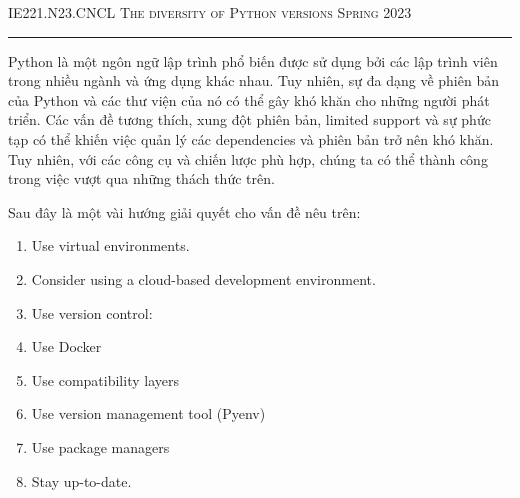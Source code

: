 \documentclass[12pt]{amsart}
\begin{document}
\thispagestyle{empty}

{\scshape IE221.N23.CNCL} \hfill {\scshape \large The diversity of Python versions} \hfill {\scshape Spring 2023}
 
\smallskip

\hrule

\bigskip
Python là một ngôn ngữ lập trình phổ biến được sử dụng bởi các lập trình viên trong nhiều ngành 
và ứng dụng khác nhau. Tuy nhiên, sự đa dạng về phiên bản của Python và các thư viện của nó có 
thể gây khó khăn cho những người phát triển. Các vấn đề tương thích, xung đột phiên bản, 
limited support và sự phức tạp có thể khiến việc quản lý các dependencies và phiên bản trở nên khó khăn. 
Tuy nhiên, với các công cụ và chiến lược phù hợp, chúng ta có thể thành công trong việc 
vượt qua những thách thức trên.
\bigskip

\bigskip

Sau đây là một vài hướng giải quyết cho vấn đề nêu trên:

\begin{enumerate}

\item  Use virtual environments.

\medskip

\item  Consider using a cloud-based development environment.

\medskip

\item  Use version control:

\medskip

\item  Use Docker

\medskip

\item  Use compatibility layers

\medskip

\item Use version management tool (Pyenv)
\medskip

\item  Use package managers

\medskip

\item  Stay up-to-date.

\medskip

\end{enumerate}

\bigskip

\bigskip
\end{document}

